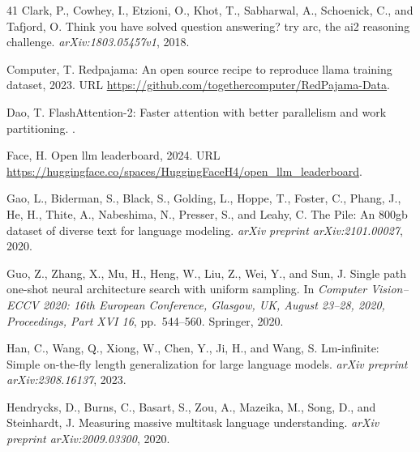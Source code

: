 \documentclass{article}
\theoremstyle{plain}
\theoremstyle{definition}
\theoremstyle{remark}
\begin{document}
\begin{thebibliography}{41}
Clark, P., Cowhey, I., Etzioni, O., Khot, T., Sabharwal, A., Schoenick, C., and
  Tafjord, O.
\newblock Think you have solved question answering? try arc, the ai2 reasoning
  challenge.
\newblock \emph{arXiv:1803.05457v1}, 2018.

Computer, T.
\newblock Redpajama: An open source recipe to reproduce llama training dataset,
  2023.
\newblock URL \url{https://github.com/togethercomputer/RedPajama-Data}.

Dao, T.
\newblock Flash{A}ttention-2: Faster attention with better parallelism and work
  partitioning.
.

Face, H.
\newblock Open llm leaderboard, 2024.
\newblock URL
  \url{https://huggingface.co/spaces/HuggingFaceH4/open_llm_leaderboard}.

Gao, L., Biderman, S., Black, S., Golding, L., Hoppe, T., Foster, C., Phang,
  J., He, H., Thite, A., Nabeshima, N., Presser, S., and Leahy, C.
\newblock The {P}ile: An 800gb dataset of diverse text for language modeling.
\newblock \emph{arXiv preprint arXiv:2101.00027}, 2020.

Guo, Z., Zhang, X., Mu, H., Heng, W., Liu, Z., Wei, Y., and Sun, J.
\newblock Single path one-shot neural architecture search with uniform
  sampling.
\newblock In \emph{Computer Vision--ECCV 2020: 16th European Conference,
  Glasgow, UK, August 23--28, 2020, Proceedings, Part XVI 16}, pp.\  544--560.
  Springer, 2020.

Han, C., Wang, Q., Xiong, W., Chen, Y., Ji, H., and Wang, S.
\newblock Lm-infinite: Simple on-the-fly length generalization for large
  language models.
\newblock \emph{arXiv preprint arXiv:2308.16137}, 2023.

Hendrycks, D., Burns, C., Basart, S., Zou, A., Mazeika, M., Song, D., and
  Steinhardt, J.
\newblock Measuring massive multitask language understanding.
\newblock \emph{arXiv preprint arXiv:2009.03300}, 2020.


\end{thebibliography}
\end{document}

